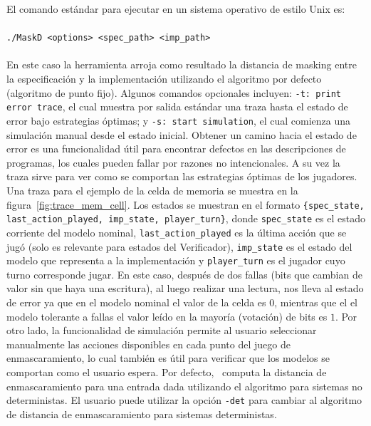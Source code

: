 El comando estándar para ejecutar {\MaskD} en un sistema operativo de estilo Unix es:
\\ 
\\
 \verb"./MaskD <options> <spec_path> <imp_path>"
\\
\\
En este caso la herramienta arroja como resultado la distancia de masking entre la especificación y la implementación utilizando el algoritmo por defecto (algoritmo de punto fijo).
Algunos comandos opcionales incluyen: \verb"-t: print error trace", el cual muestra por salida estándar una traza hasta el estado de error bajo estrategias óptimas; y  \verb"-s: start simulation", el cual comienza una simulación manual desde el estado inicial.  
Obtener un camino hacia el estado de error es una funcionalidad útil para encontrar defectos en las descripciones de programas, los cuales pueden fallar por razones no intencionales. A su vez la traza sirve para ver como se comportan las estrategias óptimas de los jugadores. Una traza para el ejemplo de la celda de memoria se muestra en la figura~\ref{fig:trace_mem_cell}. Los estados se muestran en el formato \verb"{spec_state, last_action_played, imp_state, player_turn}", donde \verb"spec_state" es el estado corriente del modelo nominal, \verb"last_action_played" es la última acción que se jugó (solo es relevante para estados del Verificador), \verb"imp_state" es el estado del modelo que representa a la implementación y \verb"player_turn" es el jugador cuyo turno corresponde jugar. En este caso, después de dos fallas (bits que cambian de valor sin que haya una escritura), al luego realizar una lectura, nos lleva al estado de error ya que en el modelo nominal el valor de la celda es $0$, mientras que el el modelo tolerante a fallas el valor leído en la mayoría (votación) de bits es $1$. Por otro lado, la funcionalidad de simulación permite al usuario seleccionar manualmente las acciones disponibles en cada punto del juego de enmascaramiento, lo cual también es útil para verificar que los modelos se comportan como el usuario espera.
Por defecto, \MaskD~computa la distancia de enmascaramiento para una entrada dada utilizando el algoritmo para sistemas no deterministas. 
El usuario puede utilizar la opción \verb"-det" para cambiar al algoritmo de distancia de enmascaramiento para sistemas deterministas.

